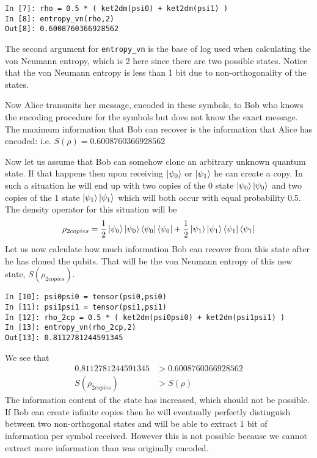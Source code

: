 \begin{verbatim}
In [7]: rho = 0.5 * ( ket2dm(psi0) + ket2dm(psi1) )
In [8]: entropy_vn(rho,2)
Out[8]: 0.6008760366928562
\end{verbatim}
The second argument for \texttt{entropy\_vn} is the base of log used when calculating the von Neumann entropy, which is 2 here since there are two possible states. Notice that the von Neumann entropy is less than 1 bit due to non-orthogonality of the states.
\par Now Alice transmits her message, encoded in these symbols, to Bob who knows the encoding procedure for the symbols but does not know the exact message. The maximum information that Bob can recover is the information that Alice has encoded: i.e. $S(\rho) = 0.6008760366928562$
\par Now let us assume that Bob can somehow clone an arbitrary unknown quantum state. If that happens then upon receiving $\ket{\psi_0}$ or $\ket{\psi_1}$ he can create a copy. In such a situation he will end up with two copies of the 0 state $\ket{\psi_0} \ket{\psi_0}$ and two copies of the 1 state $\ket{\psi_1} \ket{\psi_1}$ which will both occur with equal probability 0.5. The density operator for this situation will be
\begin{align*}
\rho_{2copies} = \frac{1}{2} \ket{\psi_0} \ket{\psi_0} \bra{\psi_0} \bra{\psi_0} + \frac{1}{2} \ket{\psi_1} \ket{\psi_1} \bra{\psi_1} \bra{\psi_1}
\end{align*}
Let us now calculate how much information Bob can recover from this state after he has cloned the qubits. That will be the von Neumann entropy of this new state, $S(\rho_{2copies})$.
\begin{verbatim}
In [10]: psi0psi0 = tensor(psi0,psi0)
In [11]: psi1psi1 = tensor(psi1,psi1)
In [12]: rho_2cp = 0.5 * ( ket2dm(psi0psi0) + ket2dm(psi1psi1) )
In [13]: entropy_vn(rho_2cp,2)
Out[13]: 0.8112781244591345
\end{verbatim}
We see that
\begin{align*}
0.8112781244591345 &> 0.6008760366928562 \\
S(\rho_{2copies}) &> S(\rho)
\end{align*}
The information content of the state has increased, which should not be possible. If Bob can create infinite copies then he will eventually perfectly distinguish between two non-orthogonal states and will be able to extract 1 bit of information per symbol received. However this is not possible because we cannot extract more information than was originally encoded. \cite{pleniophysforget}

